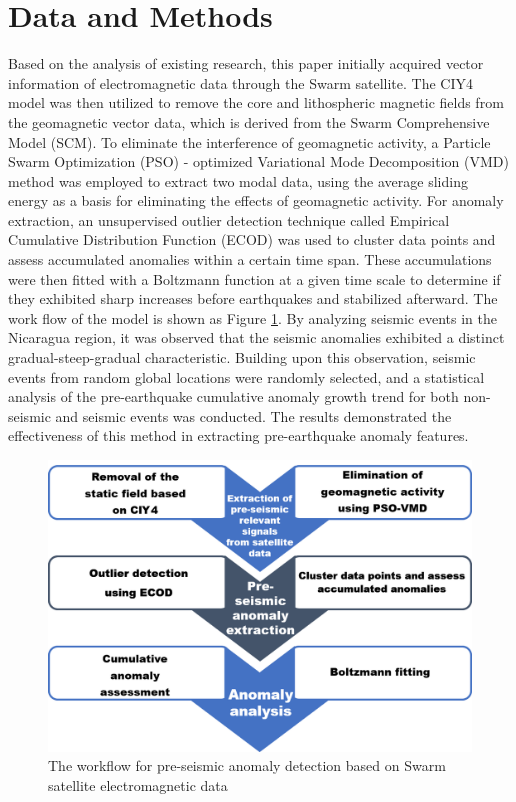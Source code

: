 \documentclass[3p,authoryear,preprint,12pt]{elsarticle}
\begin{document}
\section{Data and Methods}
Based on the analysis of existing research, this paper initially acquired vector information of electromagnetic data through the Swarm satellite. The {CIY4} \citep{sabakaComprehensiveModelEarth2018} model was then utilized to remove the core and lithospheric magnetic fields from the geomagnetic vector data, {which is derived from the Swarm
Comprehensive Model (SCM)}. To eliminate the interference of geomagnetic activity, a Particle Swarm Optimization (PSO) \citep{wanpengNovelHybridPSO2010} - optimized Variational Mode Decomposition (VMD) method was employed to extract two modal data, using the average sliding energy as a basis for eliminating the effects of geomagnetic activity. For anomaly extraction, an unsupervised outlier detection technique called Empirical Cumulative Distribution Function (ECOD)\citep{LiECODUnsupervisedOutlier2022} was used to cluster data points and assess accumulated anomalies within a certain time span. These accumulations were then fitted with a Boltzmann function at a given time scale to determine if they exhibited sharp increases before earthquakes and stabilized afterward. The work flow of the model is shown as Figure \ref{fig:flow}. By analyzing seismic events in the Nicaragua region, it was observed that the seismic anomalies exhibited a distinct gradual-steep-gradual characteristic. Building upon this observation, seismic events from random global locations were randomly selected, and a statistical analysis of the pre-earthquake cumulative anomaly growth trend for both non-seismic and seismic events was conducted. The results demonstrated the effectiveness of this method in extracting pre-earthquake anomaly features.
\begin{figure}[htbp]
	\centering
	\includegraphics[width=0.8\linewidth]{flow1.png}
	\caption{The workflow for pre-seismic anomaly detection based on Swarm satellite electromagnetic data}
	\label{fig:flow}
\end{figure}
\end{document}
